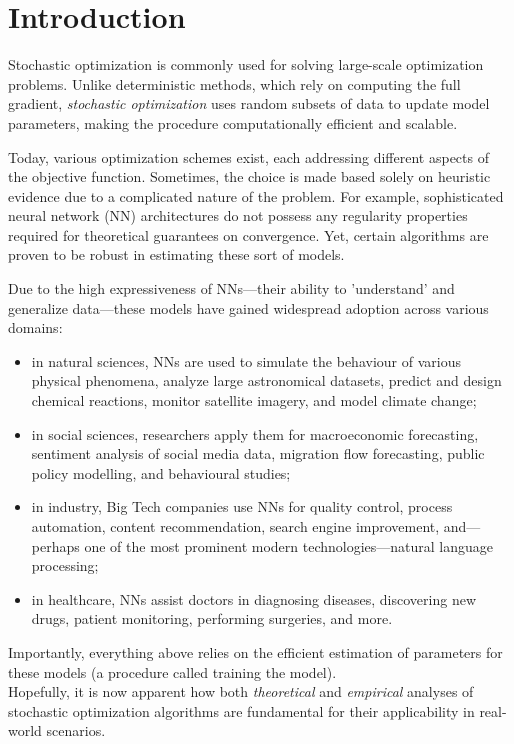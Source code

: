 \documentclass[12pt]{article}
\begin{document}
\section{Introduction}
Stochastic optimization is commonly used for solving large-scale optimization problems.
Unlike deterministic methods, which rely on computing the full gradient, \emph{stochastic optimization} uses random subsets of data to update model parameters, making the procedure computationally efficient and scalable.

Today, various optimization schemes exist, each addressing different aspects of the objective function.
Sometimes, the choice is made based solely on heuristic evidence due to a complicated nature of the problem.
For example, sophisticated neural network (NN) architectures do not possess any regularity properties required for theoretical guarantees on convergence.
Yet, certain algorithms are proven to be robust in estimating these sort of models.

Due to the high expressiveness of NNs---their ability to 'understand' and generalize data---these models have gained widespread adoption across various domains:
\begin{itemize}
    \item in natural sciences, NNs are used to simulate the behaviour of various physical phenomena, analyze large astronomical datasets, predict and design chemical reactions, monitor satellite imagery, and model climate change;
    \item in social sciences, researchers apply them for macroeconomic forecasting, sentiment analysis of social media data, migration flow forecasting, public policy modelling, and behavioural studies;
    \item in industry, Big Tech companies use NNs for quality control, process automation, content recommendation, search engine improvement, and---perhaps one of the most prominent modern technologies---natural language processing;
    \item in healthcare, NNs assist doctors in diagnosing diseases, discovering new drugs, patient monitoring, performing surgeries, and more.
\end{itemize}

Importantly, everything above relies on the efficient estimation of parameters for these models (a procedure called training the model).\\

Hopefully, it is now apparent how both \emph{theoretical} and \emph{empirical} analyses of stochastic optimization algorithms are fundamental for their applicability in real-world scenarios.
\end{document}
